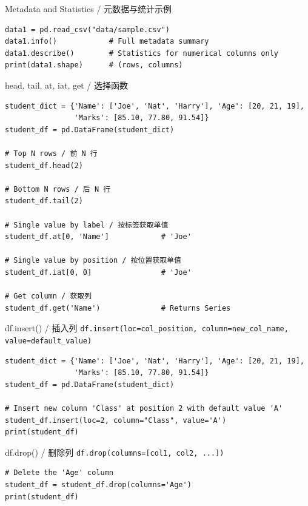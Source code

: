 \documentclass[11pt,a4paper]{report}
\let\oldtexttt\texttt
\renewcommand{\texttt}[1]{\textcolor{mainblue}{\oldtexttt{#1}}}
\begin{document}
\begin{examplebox}{Metadata and Statistics / 元数据与统计示例}
\begin{lstlisting}
data1 = pd.read_csv("data/sample.csv")
data1.info()            # Full metadata summary
data1.describe()        # Statistics for numerical columns only
print(data1.shape)      # (rows, columns)
\end{lstlisting}
\end{examplebox}

\begin{examplebox}{head, tail, at, iat, get / 选择函数}
\begin{lstlisting}
student_dict = {'Name': ['Joe', 'Nat', 'Harry'], 'Age': [20, 21, 19],
                'Marks': [85.10, 77.80, 91.54]}
student_df = pd.DataFrame(student_dict)

# Top N rows / 前 N 行
student_df.head(2)

# Bottom N rows / 后 N 行
student_df.tail(2)

# Single value by label / 按标签获取单值
student_df.at[0, 'Name']            # 'Joe'

# Single value by position / 按位置获取单值
student_df.iat[0, 0]                # 'Joe'

# Get column / 获取列
student_df.get('Name')              # Returns Series
\end{lstlisting}
\end{examplebox}

\begin{examplebox}{df.insert() / 插入列}
    \texttt{df.insert(loc=col\_position, column=new\_col\_name, value=default\_value)}
\begin{lstlisting}
student_dict = {'Name': ['Joe', 'Nat', 'Harry'], 'Age': [20, 21, 19],
                'Marks': [85.10, 77.80, 91.54]}
student_df = pd.DataFrame(student_dict)

# Insert new column 'Class' at position 2 with default value 'A'
student_df.insert(loc=2, column="Class", value='A')
print(student_df)
\end{lstlisting}
\end{examplebox}

\begin{examplebox}{df.drop() / 删除列}
    \texttt{df.drop(columns=[col1, col2, ...])}
\begin{lstlisting}
# Delete the 'Age' column
student_df = student_df.drop(columns='Age')
print(student_df)
\end{lstlisting}
\end{examplebox}
\end{document}
